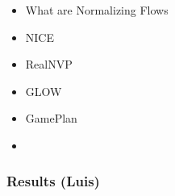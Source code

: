 \begin{frame}
\begin{itemize}
    \item What are Normalizing Flows
    \item NICE
    \item RealNVP
    \item GLOW
    \item GamePlan
    \item \textbf{\color{red}{Results}}
\end{itemize}
\end{frame}

\begin{frame}
    \frametitle{Results (Luis)}
\end{frame}
